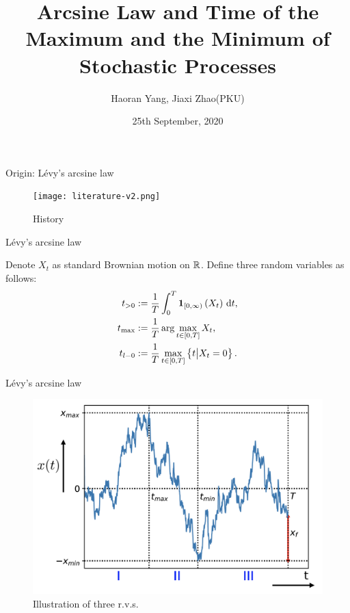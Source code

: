 \documentclass{beamer}
\title[Arcsine Law and Beyond]{Arcsine Law and Time of the Maximum and the Minimum of Stochastic Processes}
\author[H. Yang, J. Zhao (PKU)]{Haoran Yang, Jiaxi Zhao(PKU)}
\date{25th September, 2020}
\begin{document}
\par \setlength{\parindent}{2em}

\begin{frame}
\titlepage

\end{frame}


\begin{frame}{Origin: L\'{e}vy's arcsine law}
\par
\begin{figure}[H]
	\centering
  	\texttt{[image: literature-v2.png]}
  	\caption{History}
  	\label{literature}
	\end{figure}
\end{frame}


\begin{frame}{L\'{e}vy's arcsine law}
\par
Denote $X_t$ as standard Brownian motion on $\mathbb{R}$. Define three random variables as follows:
\begin{equation}
    \begin{aligned}
        t_{>0} & := \frac{1}{T}\int_0^T \mathbf{1}_{\left[ 0, \infty \right)}\left( X_t \right) \, \mathrm{d} t,    \\
        t_{\max} & := \frac{1}{T}\arg \max_{t \in \left[ 0, T \right]} X_t,    \\
        t_{l-0} & := \frac{1}{T}\max_{t \in \left[ 0, T \right]} \left\{ t \big| X_t = 0 \right\}.    \\
    \end{aligned}
\end{equation}
\end{frame}


\begin{frame}{L\'{e}vy's arcsine law}
\par
\begin{figure}[H]
	\centering
  	\includegraphics[width=0.65\linewidth]{BM.png}
  	\caption{Illustration of three r.v.s.}
  	\label{BM}
	\end{figure}
\end{frame}
\end{document}
